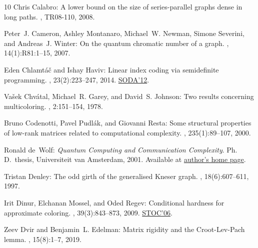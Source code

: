 \documentclass[11pt]{article}
\numberwithin{equation}{section}
\theoremstyle{definition}
\theoremstyle{plain}
\begin{document}
\begin{thebibliography}{10}
{\sc Chris Calabro}: A lower bound on the size of series-parallel graphs dense
  in long paths.
, TR08-110, 2008.

{\sc Peter~J. Cameron, Ashley Montanaro, Michael~W. Newman, Simone Severini,
  and Andreas~J. Winter}: On the quantum chromatic number of a graph.
, 14(1):R81:1--15, 2007.
\newblock [\epfmtdoi{10.37236/999}]

{\sc Eden Chlamt\'a\v{c} and Ishay Haviv}: Linear index coding via semidefinite
  programming.
, 23(2):223--247, 2014.
\newblock \prelim
  \href{https://dl.acm.org/doi/10.5555/2095116.2095151}{SODA'12}.
\newblock [\epfmtdoi{10.1017/S0963548313000564}]

{\sc Va{\v s}ek Chv{\'{a}}tal, Michael~R. Garey, and David~S. Johnson}: Two
  results concerning multicoloring.
, 2:151--154, 1978.
\newblock [\epfmtdoi{10.1016/S0167-5060(08)70329-7}]

{\sc Bruno Codenotti, Pavel Pudl{\'{a}}k, and Giovanni Resta}: Some structural
  properties of low-rank matrices related to computational complexity.
, 235(1):89--107, 2000.

{\sc Ronald de~Wolf}: {\em {\em Quantum Computing and Communication
  Complexity}}.
\newblock Ph.\,D.\ thesis, Universiteit van Amsterdam, 2001.
\newblock Available at
  \href{https://homepages.cwi.nl/~rdewolf/publ/qc/phd.pdf}{author's home page}.

{\sc Tristan Denley}: The odd girth of the generalised {K}neser graph.
, 18(6):607--611, 1997.

{\sc Irit Dinur, Elchanan Mossel, and Oded Regev}: Conditional hardness for
  approximate coloring.
, 39(3):843--873, 2009.
\newblock \prelim \href{https:doi.org/10.1145/1132516.1132567}{STOC'06}.
\newblock [\epfmtdoi{10.1137/07068062X}]

{\sc Zeev Dvir and Benjamin~L. Edelman}: Matrix rigidity and the
  {Croot-Lev-Pach} lemma.
, 15(8):1--7, 2019.


\end{thebibliography}
\end{document}

